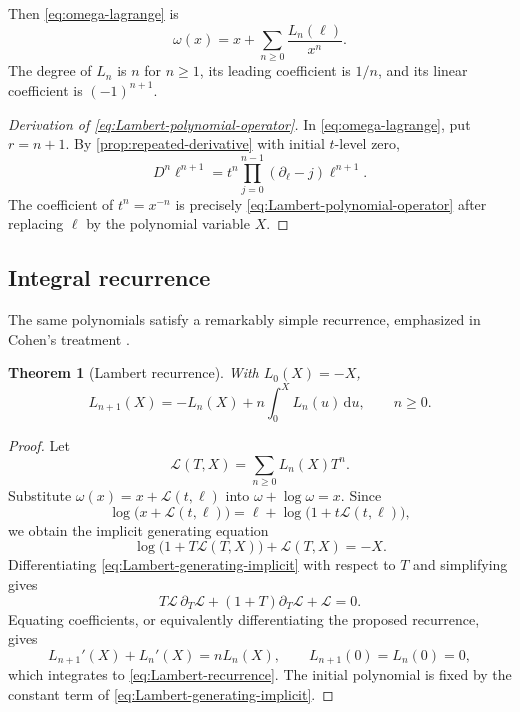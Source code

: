 \documentclass[11pt,oneside]{article}
\numberwithin{equation}{section}
\newtheorem{theorem}{Theorem}[section]
\theoremstyle{definition}
\newcommand{\dlog}{\partial_{\ell}}
\newcommand{\dd}{\,\mathrm d}
\begin{document}
Then \eqref{eq:omega-lagrange} is
\begin{equation}\label{eq:omega-Ln}
\boxed{
  \omega(x)=x+\sum_{n\ge0}\frac{L_n(\ell)}{x^n}.
}
\end{equation}
The degree of \(L_n\) is \(n\) for \(n\ge1\), its leading coefficient is
\(1/n\), and its linear coefficient is \((-1)^{n+1}\).

\begin{proof}[Derivation of \eqref{eq:Lambert-polynomial-operator}]
In \eqref{eq:omega-lagrange}, put \(r=n+1\).  By
\cref{prop:repeated-derivative} with initial \(t\)-level zero,
\[
  D^n\ell^{n+1}
  =t^n\prod_{j=0}^{n-1}(\dlog-j)\ell^{n+1}.
\]
The coefficient of \(t^n=x^{-n}\) is precisely
\eqref{eq:Lambert-polynomial-operator} after replacing \(\ell\) by the
polynomial variable \(X\).
\end{proof}

\subsection{Integral recurrence}

The same polynomials satisfy a remarkably simple recurrence, emphasized in
Cohen's treatment \cite{CohenLambert}.

\begin{theorem}[Lambert recurrence]\label{thm:Lambert-recurrence}
With \(L_0(X)=-X\),
\begin{equation}\label{eq:Lambert-recurrence}
\boxed{
  L_{n+1}(X)=-L_n(X)+n\int_0^X L_n(u)\dd u,
  \qquad n\ge0.
}
\end{equation}
\end{theorem}

\begin{proof}
Let
\begin{equation}\label{eq:Lambert-generating-F}
  \mathcal L(T,X)=\sum_{n\ge0}L_n(X)T^n.
\end{equation}
Substitute \(\omega(x)=x+\mathcal L(t,\ell)\) into
\(\omega+\log\omega=x\).  Since
\[
  \log\bigl(x+\mathcal L(t,\ell)\bigr)
  =\ell+\log\bigl(1+t\mathcal L(t,\ell)\bigr),
\]
we obtain the implicit generating equation
\begin{equation}\label{eq:Lambert-generating-implicit}
\boxed{
  \log\bigl(1+T\mathcal L(T,X)\bigr)
  +\mathcal L(T,X)=-X.
}
\end{equation}
Differentiating \eqref{eq:Lambert-generating-implicit} with respect to \(T\)
and simplifying gives
\begin{equation}\label{eq:Lambert-generating-ODE}
  T\mathcal L\,\partial_T\mathcal L
  +(1+T)\partial_T\mathcal L+\mathcal L=0.
\end{equation}
Equating coefficients, or equivalently differentiating the proposed recurrence,
gives
\[
  L_{n+1}'(X)+L_n'(X)=nL_n(X),
  \qquad L_{n+1}(0)=L_n(0)=0,
\]
which integrates to \eqref{eq:Lambert-recurrence}.  The initial polynomial is
fixed by the constant term of \eqref{eq:Lambert-generating-implicit}.
\end{proof}
\end{document}
